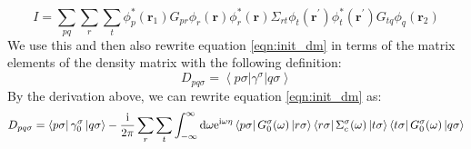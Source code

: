 \documentclass[12pt]{article}
\begin{document}
\begin{equation}
I = \sum_{pq} \sum_{r} \sum_{t} \phi_p^*(\mathbf{r}_1) G_{p r} \phi_r(\mathbf{r}) \phi_r^*(\mathbf{r}) \Sigma_{r t} \phi_t(\mathbf{r}^\prime) \phi_t^*(\mathbf{r}^\prime) G_{t q} \phi_q(\mathbf{r}_2)
\end{equation}
We use this and then also rewrite equation \ref{eqn:init_dm} in terms of the matrix elements of the density matrix
with the following definition:
\begin{equation}
D_{p q \sigma}=\left\langle p \sigma\left|\gamma^\sigma\right| q \sigma\right\rangle
\end{equation}
By the derivation above, we can rewrite equation \ref{eqn:init_dm} as:
\begin{equation}
    D_{p q \sigma}=\bra{p\sigma } \gamma _0^\sigma \ket{q\sigma } -\frac{\mathrm{i }}{2 \pi} \sum_{r} \sum_{t} \int_{-\infty }^{\infty } \mathrm{d} \omega \mathrm{e}^{\mathrm{i \omega \eta}} \bra{p\sigma } G_0^\sigma (\omega) \ket{r\sigma } \bra{r\sigma } \Sigma_c^\sigma (\omega) \ket{t\sigma } \bra{t\sigma } G_0^\sigma (\omega) \ket{q\sigma }
\label{eqn:mo_dm}
\end{equation}
\end{document}
